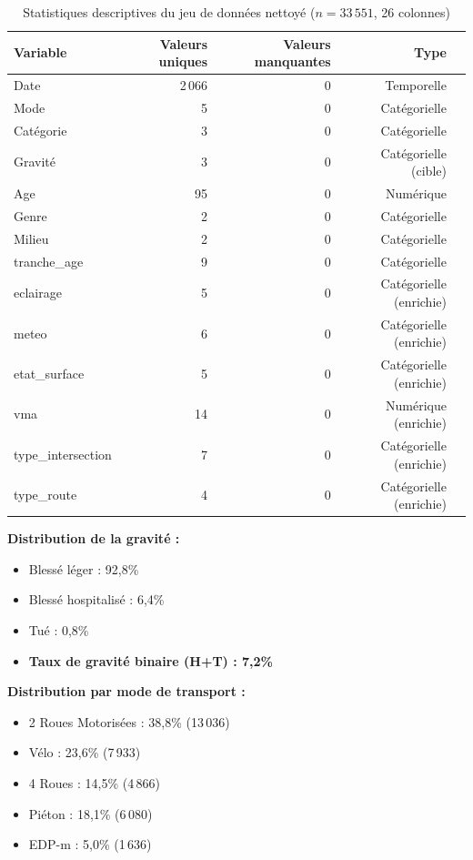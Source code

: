 \documentclass[12pt,a4paper]{article}
\begin{document}
\begin{table}[H]
\centering
\caption{Statistiques descriptives du jeu de données nettoyé
         ($n = 33\,551$, 26 colonnes)}
\label{tab:stats}
\small
\begin{tabular}{@{}l r r r r@{}}
\toprule
\textbf{Variable} & \textbf{Valeurs uniques} & \textbf{Valeurs manquantes} & \textbf{Type} \\
\midrule
Date              & 2\,066 & 0   & Temporelle \\
Mode              & 5     & 0   & Catégorielle \\
Catégorie         & 3     & 0   & Catégorielle \\
Gravité           & 3     & 0   & Catégorielle (cible) \\
Age               & 95    & 0   & Numérique \\
Genre             & 2     & 0   & Catégorielle \\
Milieu            & 2     & 0   & Catégorielle \\
tranche\_age      & 9     & 0   & Catégorielle \\
eclairage         & 5     & 0   & Catégorielle (enrichie) \\
meteo             & 6     & 0   & Catégorielle (enrichie) \\
etat\_surface     & 5     & 0   & Catégorielle (enrichie) \\
vma               & 14    & 0   & Numérique (enrichie) \\
type\_intersection & 7    & 0   & Catégorielle (enrichie) \\
type\_route       & 4     & 0   & Catégorielle (enrichie) \\
\bottomrule
\end{tabular}
\end{table}

\textbf{Distribution de la gravité :}
\begin{itemize}
  \item Blessé léger : 92,8\%
  \item Blessé hospitalisé : 6,4\%
  \item Tué : 0,8\%
  \item \textbf{Taux de gravité binaire (H+T) : 7,2\%}
\end{itemize}

\textbf{Distribution par mode de transport :}
\begin{itemize}
  \item 2 Roues Motorisées : 38,8\% (13\,036)
  \item Vélo : 23,6\% (7\,933)
  \item 4 Roues : 14,5\% (4\,866)
  \item Piéton : 18,1\% (6\,080)
  \item EDP-m : 5,0\% (1\,636)
\end{itemize}
\end{document}

